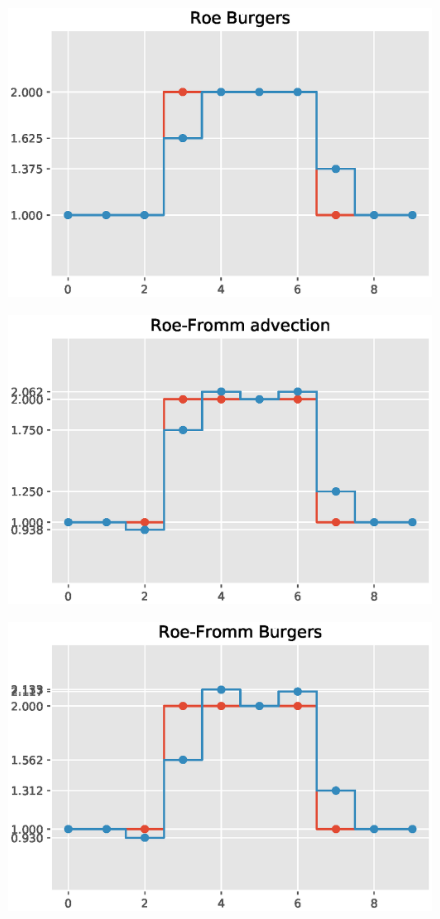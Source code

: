 \documentclass{article}
\begin{document}
  \begin{figure}[H]
  \centering
  \includegraphics[width=1\linewidth]{pics/Roeburgers.eps}
  \label{fig:perf}
 \end{figure}

 \begin{figure}[H]
  \centering
  \includegraphics[width=1\linewidth]{pics/Roefrommadvection.eps}
  \label{fig:perf}
 \end{figure}

 \begin{figure}[H]
  \centering
  \includegraphics[width=1\linewidth]{pics/Roefrommburgers.eps}
  \label{fig:perf}
 \end{figure}
\end{document}
